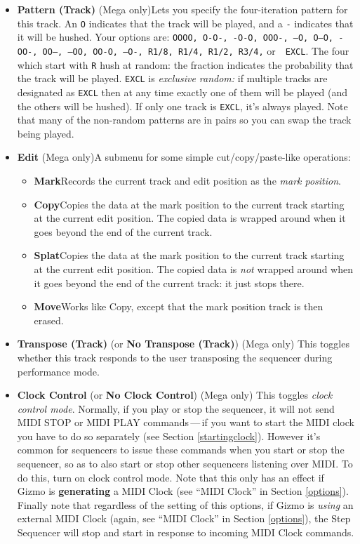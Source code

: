 \documentclass{article}
\begin{document}
\begin{itemize}
\item {\bf Pattern (Track)} (Mega only)\quad Lets you specify the four-iteration pattern for this track.  An {\tt O} indicates that the track will be played, and a {\tt -} indicates that it will be hushed.  Your options are: \texttt{OOOO, O-O-, -O-O, OOO-, ---O, O--O, -OO-, OO--, --OO, OO-O, --O-, R1/8, R1/4, R1/2, R3/4,} or\ \ {\tt EXCL}.  The four which start with {\tt R} hush at random: the fraction indicates the probability that the track will be played.  {\tt EXCL} is {\it exclusive random:} if multiple tracks are designated as {\tt EXCL} then at any time exactly one of them will be played (and the others will be hushed).  If only one track is {\tt EXCL}, it's always played.  Note that many of the non-random patterns are in pairs so you can swap the track being played.
\item {\bf Edit} (Mega only)\quad A submenu for some simple cut/copy/paste-like operations:
\begin{itemize}
\item {\bf Mark}\quad Records the current track and edit position as the {\it mark position}.
\item {\bf Copy}\quad Copies the data at the mark position to the current track starting at the current edit position.  The copied data is wrapped around when it goes beyond the end of the current track.
\item {\bf Splat}\quad Copies the data at the mark position to the current track starting at the current edit position.  The copied data is {\it not} wrapped around when it goes beyond the end of the current track: it just stops there.
\item {\bf Move}\quad Works like Copy, except that the mark position track is then erased.
\end{itemize}
\item {\bf Transpose (Track)} (or {\bf No Transpose (Track)}) (Mega only) \quad This toggles whether this track responds to the user transposing the sequencer during performance mode.
\item {\bf Clock Control} (or {\bf No Clock Control}) (Mega only) \quad This toggles {\it clock control mode}.  Normally, if you play or stop the sequencer, it will not send MIDI STOP or MIDI PLAY commands\,---\,if you want to start the MIDI clock you have to do so separately (see Section \ref{startingclock}).  However it's common for sequencers to issue these commands when you start or stop the sequencer, so as to also start or stop other sequencers listening over MIDI.  To do this, turn on clock control mode.  Note that this only has an effect if Gizmo is {\bf generating} a MIDI Clock (see ``MIDI Clock'' in Section \ref{options}).  Finally note that regardless of the setting of this options, if Gizmo is {\it using} an external MIDI Clock (again, see ``MIDI Clock'' in Section \ref{options}), the Step Sequencer will stop and start in response to incoming MIDI Clock commands.

\end{itemize}
\end{document}
